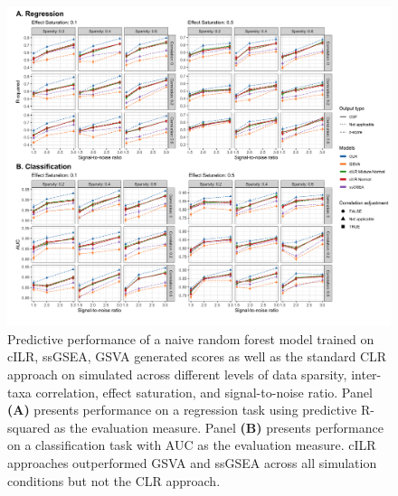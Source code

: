 \documentclass[10pt,letterpaper]{article}
\begin{document}
\begin{figure}[!ht]
    \centering
    \includegraphics[width = \linewidth]{figures/sim_pred_combined.png}
    \caption{Predictive performance of a naive random forest model trained on cILR, ssGSEA, GSVA generated scores as well as the standard CLR approach on simulated across different levels of data sparsity, inter-taxa correlation, effect saturation, and signal-to-noise ratio. Panel \textbf{(A)} presents performance on a regression task using predictive R-squared as the evaluation measure. Panel \textbf{(B)} presents performance on a classification task with AUC as the evaluation measure. cILR approaches outperformed GSVA and ssGSEA across all simulation conditions but not the CLR approach.}
    \label{fig:6}
\end{figure}


\end{document}
